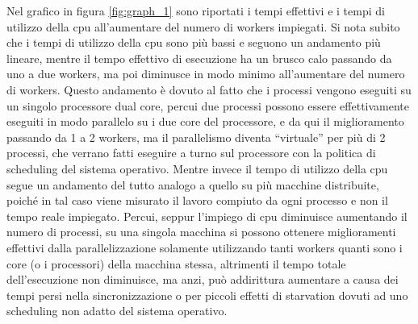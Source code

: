 Nel grafico in figura \ref{fig:graph_1} sono riportati i tempi effettivi e i tempi di utilizzo della cpu all'aumentare del numero di workers impiegati. Si nota subito che i tempi di utilizzo della cpu sono pi\`u bassi e seguono un andamento pi\`u lineare, mentre il tempo effettivo di esecuzione ha un brusco calo passando da uno a due workers, ma poi diminusce in modo minimo all'aumentare del numero di workers. Questo andamento \`e dovuto al fatto che i processi vengono eseguiti su un singolo processore dual core, percui due processi possono essere effettivamente eseguiti in modo parallelo su i due core del processore, e da qui il miglioramento passando da 1 a 2 workers, ma il parallelismo diventa ``virtuale'' per pi\`u di 2 processi, che verrano fatti eseguire a turno sul processore con la politica di scheduling del sistema operativo. Mentre invece il tempo di utilizzo della cpu segue un andamento del tutto analogo a quello su pi\`u macchine distribuite, poich\'e in tal caso viene misurato il lavoro compiuto da ogni processo e non il tempo reale impiegato. Percui, seppur l'impiego di cpu diminuisce aumentando il numero di processi, su una singola macchina si possono ottenere miglioramenti effettivi dalla parallelizzazione solamente utilizzando tanti workers quanti sono i core (o i processori) della macchina stessa, altrimenti il tempo totale dell'esecuzione non diminuisce, ma anzi, pu\`o addirittura aumentare a causa dei tempi persi nella sincronizzazione o per piccoli effetti di starvation dovuti ad uno scheduling non adatto del sistema operativo.
